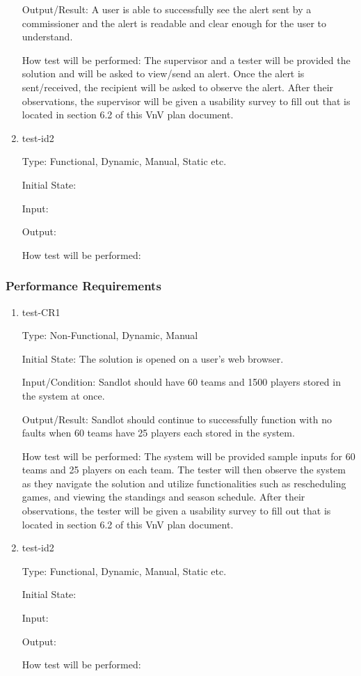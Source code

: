 \documentclass[12pt, titlepage]{article}
\begin{document}
\begin{enumerate}
  Output/Result: A user is able to successfully see the alert sent by a commissioner and
  the alert is readable and clear enough for the user to understand.
            
  How test will be performed: The supervisor and a tester will be provided the solution and
  will be asked to view/send an alert. Once the alert is sent/received, the recipient will
  be asked to observe the alert. After their observations, the supervisor will be given
  a usability survey to fill out that is located in section 6.2 of this VnV plan document.

  \item{test-id2\\}
  
  Type: Functional, Dynamic, Manual, Static etc.
            
  Initial State: 
            
  Input: 
            
  Output: 
            
  How test will be performed:
  
  \end{enumerate}

\subsubsection{Performance Requirements}

\begin{enumerate}

  \item{test-CR1\\}
  
  Type: Non-Functional, Dynamic, Manual
            
  Initial State: The solution is opened on a user's web browser.
            
  Input/Condition: Sandlot should have 60 teams and 1500 players stored in the system at
  once.
            
  Output/Result: Sandlot should continue to successfully function with no faults when
  60 teams have 25 players each stored in the system.
            
  How test will be performed: The system will be provided sample inputs for 60 teams and
  25 players on each team. The tester will then observe the system as they navigate the
  solution and utilize functionalities such as rescheduling games, and viewing the standings
  and season schedule. After their observations, the tester will be given
  a usability survey to fill out that is located in section 6.2 of this VnV plan document.
            
  \item{test-id2\\}
  
  Type: Functional, Dynamic, Manual, Static etc.
            
  Initial State: 
            
  Input: 
            
  Output: 
            
  How test will be performed: 
  
  \end{enumerate}
\end{document}
